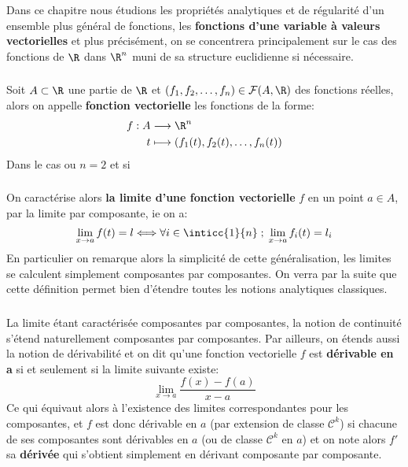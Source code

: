 \chapter*{} %

Dans ce chapitre nous étudions les propriétés analytiques et de régularité d'un ensemble plus général de fonctions, les \textbf{fonctions d'une variable à valeurs vectorielles} et plus précisément, on se concentrera principalement sur le cas des fonctions de \(\R\) dans \(\R^n\) muni de sa structure euclidienne si nécessaire.

\subsection*{}
Soit \(A \subset \R\) une partie de \(\R\) et \((f_1, f_2, \ldots, f_n)  \in \mathcal{F}(A, \R)\) des fonctions réelles, alors on appelle \textbf{fonction vectorielle} les fonctions de la forme:
\[
   \begin{aligned}
      f: A &\longrightarrow \R^n\\
      t &\longmapsto (f_1(t), f_2(t), \ldots, f_n(t))
   \end{aligned}
\]
Dans le cas ou \(n = 2\) et si \(\)
\subsection*{}
On caractérise alors \textbf{la limite d'une fonction vectorielle} \(f\) en un point \(a \in A\), par la limite par composante, ie on a:
\[
   \lim_{x \rightarrow a} f(t) = l \Longleftrightarrow \forall i \in \inticc{1}{n} \; ; \; \lim_{x \rightarrow a} f_i(t) = l_i  
\]
En particulier on remarque alors la simplicité de cette généralisation, les limites se calculent simplement composantes par composantes. On verra par la suite que cette définition permet bien d'étendre toutes les notions analytiques classiques.
\subsection*{}
La limite étant caractérisée composantes par composantes, la notion de continuité s'étend naturellement composantes par composantes. Par ailleurs, on étends aussi la notion de dérivabilité et on dit qu'une fonction vectorielle \(f\) est \textbf{dérivable en a} si et seulement si la limite suivante existe:
\[
   \lim_{x \rightarrow a} \frac{f(x) - f(a)}{x - a}
\]
Ce qui équivaut alors à l'existence des limites correspondantes pour les composantes, et \(f\) est donc dérivable en \(a\) (par extension de classe \(\mathcal{C}^k\)) si chacune de ses composantes sont dérivables en \(a\) (ou de classe \(\mathcal{C}^k\) en \(a\)) et on note alors \(f'\) sa \textbf{dérivée} qui s'obtient simplement en dérivant composante par composante.\<

